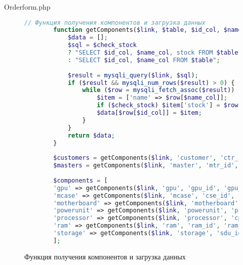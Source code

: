 

Orderform.php
\begin{figure}[ht]
	\begin{lstlisting}[language=Php]
		// Функция получения компонентов и загрузка данных
		function getComponents($link, $table, $id_col, $name_col, $check_stock = false) {
			$data = [];
			$sql = $check_stock 
			? "SELECT $id_col, $name_col, stock FROM $table WHERE stock > 0"
			: "SELECT $id_col, $name_col FROM $table";
			
			$result = mysqli_query($link, $sql);
			if ($result && mysqli_num_rows($result) > 0) {
				while ($row = mysqli_fetch_assoc($result)) {
					$item = ['name' => $row[$name_col]];
					if ($check_stock) $item['stock'] = $row['stock'];
					$data[$row[$id_col]] = $item;
				}
			}
			return $data;
		}
		
		$customers = getComponents($link, 'customer', 'ctr_id', 'full_name');
		$masters = getComponents($link, 'master', 'mtr_id', 'full_name');
		
		$components = [
		'gpu' => getComponents($link, 'gpu', 'gpu_id', 'gpu_name', true),
		'mcase' => getComponents($link, 'mcase', 'cse_id', 'case_name', true),
		'motherboard' => getComponents($link, 'motherboard', 'mbd_id', 'motherboard_name', true),
		'powerunit' => getComponents($link, 'powerunit', 'psu_id', 'power_name', true),
		'processor' => getComponents($link, 'processor', 'cpu_id', 'unit_name', true),
		'ram' => getComponents($link, 'ram', 'ram_id', 'ram_name', true),
		'storage' => getComponents($link, 'storage', 'sdu_id', 'storage_name', true)
		];
	\end{lstlisting}
	\caption{Функция получения компонентов и загрузка данных}
	\label{fig:orderform_part1}
\end{figure}

